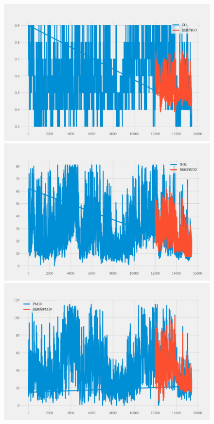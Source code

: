 \documentclass[a4paper,10pt]{my_paper}
\numberwithin{equation}{section}
\begin{document}
\begin{figure}[htbp]
	\centering
		\begin{minipage}[c]{0.3\textwidth} %
			\centering
			\includegraphics[width=1\textwidth]{prob4/预测A1地_CO.pdf} %
		\end{minipage}%
		\begin{minipage}[c]{0.3\textwidth}
			\centering
			\includegraphics[width=1\textwidth]{prob4/预测A1地_NO2.pdf}
		\end{minipage}
		\begin{minipage}[c]{0.3\textwidth}
			\centering
			\includegraphics[width=1\textwidth]{prob4/预测A1地_PM10.pdf}

\end{minipage}
\end{figure}
\end{document}
